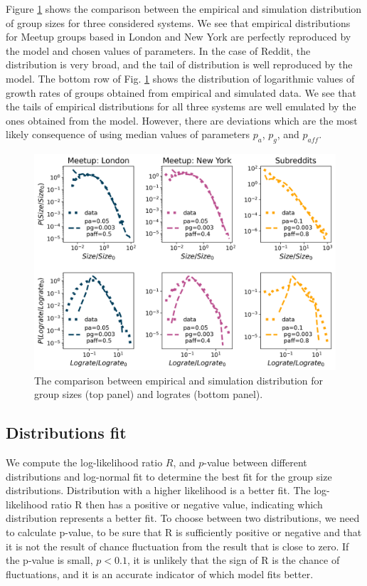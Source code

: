 Figure \ref{fig:fig6} shows the comparison between the empirical and simulation distribution of group sizes for three considered systems. We see that empirical distributions for Meetup groups based in London and New York are perfectly reproduced by the model and chosen values of parameters. In the case of Reddit, the distribution is very broad, and the tail of distribution is well reproduced by the model.
The bottom row of Fig. \ref{fig:fig6} shows the distribution of logarithmic values of growth rates of groups obtained from empirical and simulated data. We see that the tails of empirical distributions for all three systems are well emulated by the ones obtained from the model. However, there are deviations which are the most likely consequence of using median values of parameters $p_{a}$, $p_{g}$, and $p_{aff}$.
\begin{figure}[h!]
	\centering
	\includegraphics[width=0.8\linewidth]{Figures/figures/Fig4.png}
	\caption[The comparison between empirical and simulated data.]{The comparison between empirical and simulation distribution for group sizes (top panel) and logrates (bottom panel).}
	\label{fig:fig6}
\end{figure}

\subsection{Distributions fit}

We compute the log-likelihood ratio $R$, and $p$-value between different distributions and log-normal fit \cite{clauset2009power} to determine the best fit for the group size distributions. Distribution with a higher likelihood is a better fit. The log-likelihood ratio R then has a positive or negative value, indicating which distribution represents a better fit. To choose between two distributions, we need to calculate p-value,  to be sure that R is sufficiently positive or negative and that it is not the result of chance fluctuation from the result that is close to zero. If the p-value is small, $p<0.1$, it is unlikely that the sign of R is the chance of fluctuations, and it is an accurate indicator of which model fits better. \\

